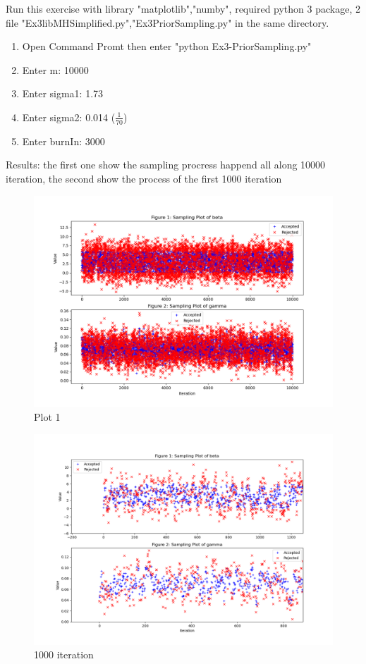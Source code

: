 \documentclass[a4paper]{article}
\begin{document}
    Run this exercise with library "matplotlib","numby", required python 3 package, 2 file "Ex3libMHSimplified.py","Ex3PriorSampling.py" in the same directory.
    \begin{enumerate}
        \item Open Command Promt then enter "python Ex3-PriorSampling.py"
        \item Enter m: 10000
        \item Enter sigma1: 1.73
        \item Enter sigma2: 0.014 ($\frac{1}{70}$)
        \item Enter burnIn: 3000
    \end{enumerate}
    Results: the first one show the sampling procress happend all along 10000 iteration, the second show the process of the first 1000 iteration
    \begin{figure}[!ht]
        \includegraphics[width=\linewidth, inner]{Images/ex3plot1.png}
        \caption{Plot 1}
        \label{fig:ex3-1}
    \end{figure}
    \newpage
    \begin{figure}[!ht]
        \centering
        \includegraphics[width=\linewidth]{Images/ex3plot1000.png}
        \caption{1000 iteration}
        \label{fig:ex3-2}
    \end{figure}
\end{document}
